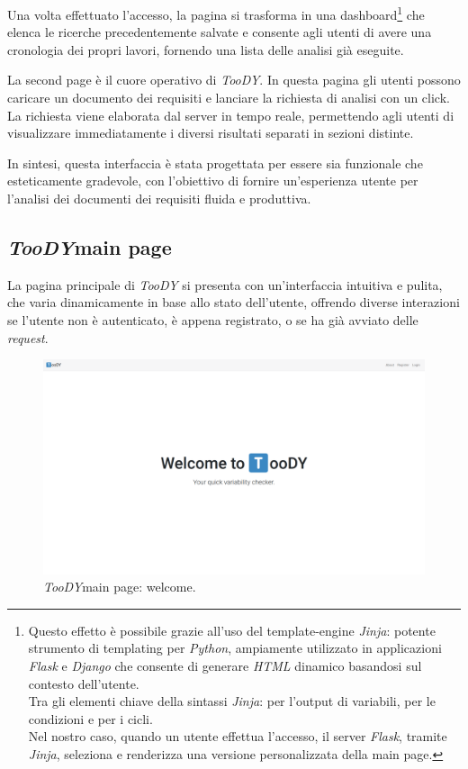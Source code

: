 \documentclass[12pt]{report}
\newcommand{\toody}{\textsl{TooDY}\xspace}
\newcommand{\python}{\textsl{Python}\xspace}
\newcommand{\jinja}{\textsl{Jinja}\xspace}
\newcommand{\flask}{\textsl{Flask}\xspace}
\newcommand{\django}{\textsl{Django}\xspace}
\newcommand{\html}{\textsl{HTML}\xspace}
\begin{document}
Una volta effettuato l'accesso, la pagina si trasforma in una dashboard\footnote{Questo effetto è possibile grazie all'uso del template-engine \jinja: potente strumento di templating per \python, ampiamente utilizzato in applicazioni \flask e \django che consente di generare \html dinamico basandosi sul contesto dell'utente.\\
Tra gli elementi chiave della sintassi \jinja: \texttt{\string{\string{ \string}\string}} per l'output di variabili, \texttt{} per le condizioni e \texttt{} per i cicli.\\
Nel nostro caso, quando un utente effettua l'accesso, il server \flask, tramite \jinja, seleziona e renderizza una versione personalizzata della main page.} che elenca le ricerche precedentemente salvate e consente agli utenti di avere una cronologia dei propri lavori, fornendo una lista delle analisi già eseguite.

La \textsf{second page} è il cuore operativo di \toody. In questa pagina gli utenti possono caricare un documento dei requisiti e lanciare la richiesta di analisi con un click. La richiesta viene elaborata dal server in tempo reale, permettendo agli utenti di visualizzare immediatamente i diversi risultati separati in sezioni distinte.

In sintesi, questa interfaccia è stata progettata per essere sia funzionale che esteticamente gradevole, con l'obiettivo di fornire un'esperienza utente per l'analisi dei documenti dei requisiti fluida e produttiva.


\subsection{\toody \textsf{main page}}
La pagina principale di \toody si presenta con un'interfaccia intuitiva e pulita, che varia dinamicamente in base allo stato dell'utente, offrendo diverse interazioni se l'utente non è autenticato, è appena registrato, o se ha già avviato delle \textit{request}.

\begin{figure}[H]
\centering
\includegraphics[width=1.0\textwidth]{pagina1-welcome.png}
\caption{\toody \textsf{main page}: welcome.}
\label{fig:pagina1-login}
\end{figure}
\end{document}
